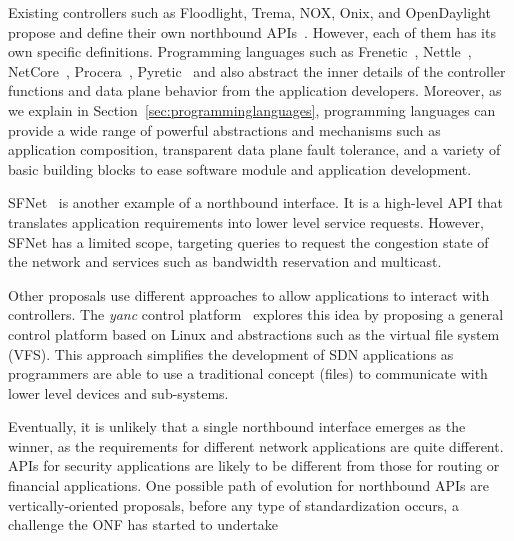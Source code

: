 Existing controllers such as Floodlight, Trema, NOX, Onix, and OpenDaylight propose and define their own northbound 
APIs~\cite{salisbury2012-1,chua2012}.
However, each of them has its own specific definitions.
Programming languages such as Frenetic~\cite{foster2011}, Nettle~\cite{voellmy2011-1}, NetCore~\cite{monsanto2012}, Procera~\cite{voellmy2012}, Pyretic~\cite{reich2013} and  also abstract the inner details of the controller functions and data plane behavior from the application developers.
Moreover, as we explain in 
Section~\ref{sec:programminglanguages}, programming languages can provide a wide range of powerful 
abstractions and mechanisms such as application composition, transparent data plane fault tolerance, 
and a variety of basic building blocks to ease software module and application development.

SFNet~\cite{yap2010} is another example of a northbound interface. It is a high-level API that 
translates application requirements into lower level service requests. However, SFNet has a limited scope, 
targeting queries to request the congestion state of the network and services such as bandwidth reservation 
and multicast.

Other proposals use different approaches to allow applications to 
interact with controllers. The \textit{yanc} control platform~\cite{monaco2013} explores 
this idea by proposing a general control platform based on Linux and abstractions such as the virtual file 
system (VFS). This approach simplifies the development of SDN applications as programmers are able to use
a traditional concept (files) to communicate with lower level devices and sub-systems.
 
Eventually, it is unlikely that a single northbound interface emerges as the winner, as the requirements for 
different network applications are quite different. APIs for security applications are likely to be different 
from those for routing or financial applications. One possible path of evolution for northbound APIs are 
vertically-oriented proposals, before any type of standardization occurs, a challenge the ONF has started 
to undertake  

